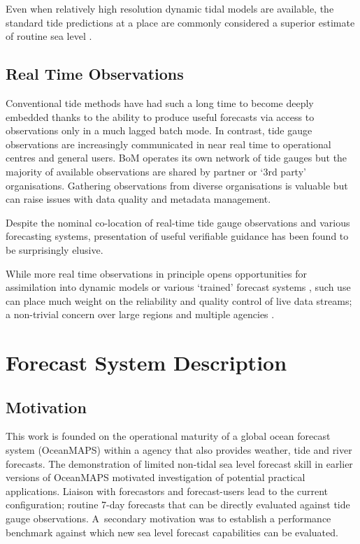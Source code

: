 Even when relatively high resolution dynamic tidal models are available, the standard tide predictions at a place are commonly considered a superior estimate of routine sea level \cite{Horsburgh:2008gw,Egbert:1996vr}.


\subsection{Real Time Observations}
Conventional tide methods have had such a long time to become deeply embedded \cite{Cartwright:2000tt} thanks to the ability to produce useful forecasts via access to observations only in a much lagged batch mode.  
In contrast, tide gauge observations are increasingly communicated in near real time to operational centres and general users. 
BoM operates its own network of tide gauges \cite{Greenslade:2012um} but the majority of available observations are shared by partner or `3rd party' organisations. 
Gathering observations from diverse organisations is valuable but can raise issues with data quality and metadata management.

Despite the nominal co-location of real-time tide gauge observations and various forecasting systems, presentation of useful verifiable guidance has been found to be surprisingly elusive.     

While more real time observations in principle opens opportunities for assimilation into dynamic models or various `trained' forecast systems \cite{Horsburgh:2011th}, such use can place much weight on the reliability and quality control of live data streams; a non-trivial concern over large regions and multiple agencies \cite{Mourre:2006hz}.


\section{Forecast System Description}
\vspace{-6pt}
\subsection{Motivation}
This work is founded on the operational maturity of a global ocean forecast system (OceanMAPS) within a agency that also provides weather, tide and river forecasts.
The demonstration of limited non-tidal sea level forecast skill in earlier versions of OceanMAPS \cite{Taylor:2010ud} motivated investigation of potential practical applications. 
Liaison with forecastors and forecast-users lead to the current configuration; routine 7-day forecasts that can be directly evaluated against tide gauge observations.
A~secondary motivation was to establish a performance benchmark against which new sea level forecast capabilities can be evaluated. 

